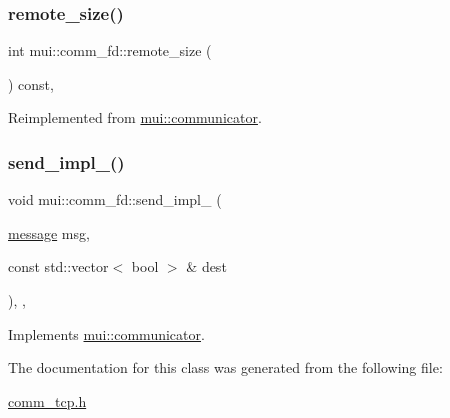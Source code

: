 \subsubsection{\texorpdfstring{remote\+\_\+size()}{remote\_size()}}
{\footnotesize\ttfamily int mui\+::comm\+\_\+fd\+::remote\+\_\+size (\begin{DoxyParamCaption}{ }\end{DoxyParamCaption}) const\hspace{0.3cm}{\ttfamily [inline]}, {\ttfamily [virtual]}}



Reimplemented from \hyperlink{classmui_1_1communicator_a8683d36801b78685ce5a58da2c6a6195}{mui\+::communicator}.

\mbox{\label{classmui_1_1comm__fd_a025e0264f0424a2b28f3c14ecde5ba24}} 
\subsubsection{\texorpdfstring{send\+\_\+impl\+\_\+()}{send\_impl\_()}}
{\footnotesize\ttfamily void mui\+::comm\+\_\+fd\+::send\+\_\+impl\+\_\+ (\begin{DoxyParamCaption}\item[{\hyperlink{structmui_1_1message}{message}}]{msg,  }\item[{const std\+::vector$<$ bool $>$ \&}]{dest }\end{DoxyParamCaption})\hspace{0.3cm}{\ttfamily [inline]}, {\ttfamily [protected]}, {\ttfamily [virtual]}}



Implements \hyperlink{classmui_1_1communicator_a1fccb014ae855d7b7d0fc53f7f22b9aa}{mui\+::communicator}.



The documentation for this class was generated from the following file\+:\begin{DoxyCompactItemize}
\item 
\hyperlink{comm__tcp_8h}{comm\+\_\+tcp.\+h}\end{DoxyCompactItemize}
